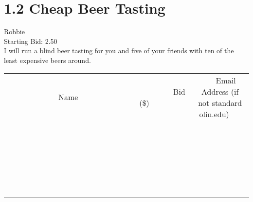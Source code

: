 \documentclass[11pt]{article}
\begin{document}
					\section*{1.2 Cheap Beer Tasting}
					Robbie \\
					Starting Bid: 2.50 \\
					I will run a blind beer tasting for you and five of your friends with ten of the least expensive beers around. \\
					[6ex]
					\begin{tabular}{c c c}
						~~~~~~~~~~~~~Name~~~~~~~~~~~~~ & ~~~~~~~~~Bid (\$)~~~~~~~~~ & ~~~Email Address (if not standard olin.edu)~~~ \\
				
 & & \\
\hline
 & & \\
\hline
 & & \\
\hline
 & & \\
\hline
 & & \\
\hline
 & & \\
\hline
 & & \\
\hline
 & & \\
\hline
 & & \\
\hline
 & & \\
\hline
 & & \\
\hline
 & & \\
\hline
 & & \\
\hline
 & & \\
\hline
 & & \\
\hline
 & & \\
\hline
 & & \\
\hline
 & & \\
\hline
 & & \\
\hline
 & & \\
\hline
 & & \\
\hline
 & & \\
\hline
 & & \\
\hline
 & & \\
\hline
 & & \\
\hline
 & & \\
\hline
					\end{tabular}
					\clearpage
				
\end{document}
